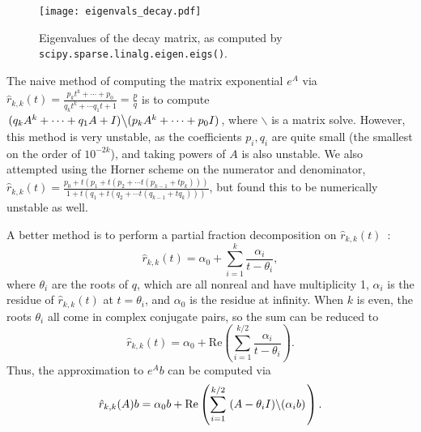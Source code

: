 \begin{figure}[!ht]
\centering
\texttt{[image: eigenvals\_decay.pdf]}
\caption{Eigenvalues of the decay matrix, as computed by
  \texttt{scipy.\allowbreak{}sparse.\allowbreak{}linalg.\allowbreak{}eigen.\allowbreak{}eigs()}.}
\label{fig:eigenvals-decay}
\end{figure}


The naive method of computing the matrix exponential $e^A$ via
$\hat{r}_{k, k}(t)=\frac{p_kt^k + \cdots + p_0}{q_kt^k + \cdots q_1t +
  1}=\frac{p}{q}$ is to compute
$\left .(q_kA^k + \cdots + q_1A + I)\middle\backslash(p_kA^k + \cdots + p_0 I)\right.$, where
$\backslash$ is a matrix solve. However, this method is very unstable, as the
coefficients $p_i,q_i$ are quite small (the smallest on the order of
$10^{-2k}$), and taking powers of $A$ is also unstable. We also attempted
using the Horner scheme on the numerator and denominator,
$\hat{r}_{k, k}(t)=\frac{p_0 + t(p_1 + t(p_2 + \cdots t(p_{k-1} + tp_k)))}{1 +
  t(q_1 + t(q_2 + \cdots t(q_{k-1} + tq_k)))}$, but found this to be
numerically unstable as well.

A better method is to perform a partial fraction decomposition on $\hat{r}_{k,
  k}(t)$~\cite{pusa2010computing}:
\begin{equation}
\label{eq:part-frac}
  \hat{r}_{k, k}(t) = \alpha_0 + \sum_{i=1}^k \frac{\alpha_i}{t - \theta_i},
\end{equation}
where $\theta_i$ are the roots of $q$, which are all
nonreal and have multiplicity 1, $\alpha_i$ is the residue of
$\hat{r}_{k, k}(t)$ at $t=\theta_i$, and $\alpha_0$ is the residue at
infinity. When $k$ is even, the roots $\theta_i$ all come in complex conjugate
pairs, so the sum can be reduced to
\begin{equation}
  \hat{r}_{k, k}(t) = \alpha_0 + \mathrm{Re}\left(\sum_{i=1}^{k/2}
    \frac{\alpha_i}{t - \theta_i}\right).
\end{equation}
Thus, the approximation to $e^Ab$ can be computed via
\begin{equation}
\label{eq:part-frac-matrix-re}
  \hat{r}_{k, k}(A)b = \alpha_0b + \mathrm{Re}\left(\sum_{i=1}^{k/2} \left. (A -
    \theta_i I)\middle\backslash(\alpha_i b) \right.\right).
\end{equation}

